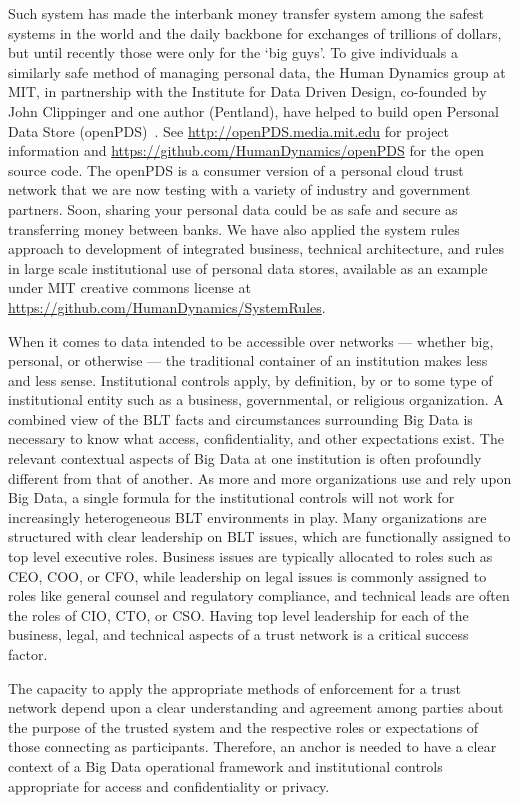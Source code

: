 Such system has made the interbank money transfer system among the safest systems in the world and the daily backbone for exchanges of trillions of dollars, but until recently those were only for the `big guys'.
To give individuals a similarly safe method of managing personal data, the Human Dynamics group at MIT, in partnership with the Institute for Data Driven Design, co-founded by John Clippinger and one author (Pentland), have helped to build open Personal Data Store (openPDS)~\cite{de2012trusted}. See \url{http://openPDS.media.mit.edu} for project information and \url{https://github.com/HumanDynamics/openPDS} for the open source code.
The openPDS is a consumer version of a personal cloud trust network that we are now testing with a variety of industry and government partners.
Soon, sharing your personal data could be as safe and secure as transferring money between banks.
We have also applied the system rules approach to development of integrated business, technical architecture, and rules in large scale institutional use of personal data stores, available as an example under MIT creative commons license at \url{https://github.com/HumanDynamics/SystemRules}. 

When it comes to data intended to be accessible over networks --- whether big, personal, or otherwise --- the traditional container of an institution makes less and less sense.
Institutional controls apply, by definition, by or to some type of institutional entity such as a business, governmental, or religious organization.
A combined view of the BLT facts and circumstances surrounding Big Data is necessary to know what access, confidentiality, and other expectations exist.
The relevant contextual aspects of Big Data at one institution is often profoundly different from that of another.
As more and more organizations use and rely upon Big Data, a single formula for the institutional controls will not work for increasingly heterogeneous BLT environments in play.
Many organizations are structured with clear leadership on BLT issues, which are functionally assigned to top level executive roles. 
Business issues are typically allocated to roles such as CEO, COO, or CFO, while leadership on legal issues is commonly assigned to roles like general counsel and regulatory compliance, and technical leads are often the roles of CIO, CTO, or CSO.
Having top level leadership for each of the business, legal, and technical aspects of a trust network is a critical success factor.

The capacity to apply the appropriate methods of enforcement for a trust network depend upon a clear understanding and agreement among parties about the purpose of the trusted system and the respective roles or expectations of those connecting as participants.
Therefore, an anchor is needed to have a clear context of a Big Data operational framework and institutional controls appropriate for access and confidentiality or privacy.

